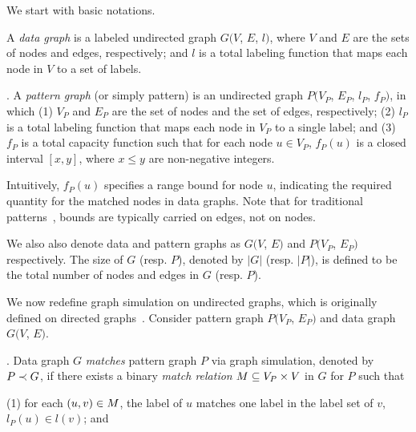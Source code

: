 We start with basic notations.

 A {\em data graph} is a labeled undirected graph $G(V$, $E$, $l)$, where $V$ and $E$ are the sets of nodes and edges, respectively; and $l$ is a total labeling function that maps each node in $V$ to a set of labels.

.
A {\em pattern graph} (or simply pattern) is an undirected graph $P(V_P$, $E_P$, $l_P$, $f_P)$, in which
(1) $V_P$ and $E_P$ are the set of nodes and the set of edges, respectively;
(2) $l_P$ is a total labeling function that maps each node in $V_P$ to a single label; and
(3) $f_P$ is a total capacity function such that for each node $u\in V_P$, $f_P(u)$ is a closed interval $[x, y]$, where $x\le y$ are non-negative integers.

Intuitively, $f_P(u)$ specifies a range bound for node $u$,
indicating the required quantity for the matched nodes in data graphs.
Note that for traditional patterns~\cite{Galla06, b-matching,FanLMTWW10,FanCount16}, bounds are typically carried on edges, not on nodes.

We also also denote data and pattern graphs as $G(V$, $E)$ and $P(V_{P}$, $E_{P})$ respectively. The size of $G$ (resp. $P$), denoted by $|G|$ (resp. $|P|$), is defined to be the total number of nodes and edges in $G$ (resp. $P$).



We now redefine graph simulation on undirected graphs, which is originally defined on directed graphs~\cite{infsimu95,FanLMTWW10}. Consider pattern graph $P(V_P$, $E_P)$ and data graph $G(V$, $E)$.


. Data graph $G$ {\em matches} pattern graph $P$ via
graph simulation, denoted by $P \prec G$, if there exists a binary {\em match relation} $M \subseteq V_P \times V$ in $G$ for $P$ such that

\vspace{0.5ex}
\ni
(1) for each $(u, v) \in M$, the label of $u$ matches one label in the label set of $v$, \ie $l_{P}(u) \in l(v)$; and

